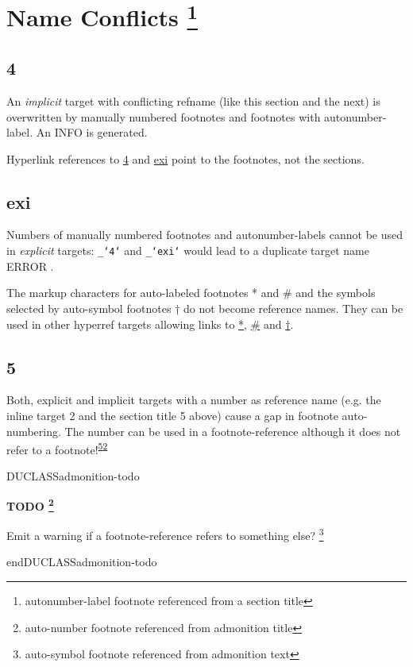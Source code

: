 \documentclass[a4paper]{article}
\newenvironment{DUclass}[1]%
    {%
     \def\DocutilsClassFunctionName{DUCLASS#1}
     \csname \DocutilsClassFunctionName \endcsname}%
    {\csname end\DocutilsClassFunctionName \endcsname}%
\newenvironment{DUadmonition}%
    {\begin{center}
       \begin{lrbox}{\DUadmonitionbox}
         \begin{minipage}{0.9\linewidth}
    }%
    {    \end{minipage}
       \end{lrbox}
       \fbox{\usebox{\DUadmonitionbox}}
     \end{center}
    }
\providecommand*{\DUtitle}[1]{%
  \smallskip\noindent\textbf{#1}\smallskip}
\begin{document}
\section{Name Conflicts%
\texorpdfstring{%
 \protect\footnote{\label{sec}%
  autonumber-label footnote referenced from a section title
}}{}}


\subsection{4}

An \emph{implicit} target with conflicting refname (like this section and the
next) is overwritten by manually numbered footnotes and footnotes
with autonumber-label.  An INFO is generated.

Hyperlink references to \hyperref[footnote-1]{4} and \hyperref[exi]{exi} point to the footnotes, not the
sections.


\subsection{exi}

Numbers of manually numbered footnotes and autonumber-labels
cannot be used in \emph{explicit} targets:
\texttt{\_`4`} and \texttt{\_`exi`} would lead to a \textquotedbl{}duplicate target name\textquotedbl{} ERROR .

The markup characters for auto-labeled footnotes \textquotedbl{}%
\label{inline-1}*\textquotedbl{} and \textquotedbl{}%
\label{inline-2}\#\textquotedbl{} and
the symbols selected by auto-symbol footnotes \textquotedbl{}%
\label{inline-3}†\textquotedbl{} do not become
reference names. They can be used in other hyperref targets allowing
links to \hyperref[inline-1]{*}, \hyperref[inline-2]{\#} and \hyperref[inline-3]{†}.


\subsection{5%
  \label{section-2}%
}

Both, explicit and implicit targets with a number as reference name (e.g.
the inline target \textquotedbl{}%
\label{inline-4}2\textquotedbl{} and the section title \textquotedbl{}5\textquotedbl{} above) cause a gap in
footnote auto-numbering.  The number can be used in a
footnote-reference although it does not refer to a footnote!\textsuperscript{\hyperref[section-2]{5}}\textsuperscript{\hyperref[inline-4]{2}}

\begin{DUclass}{admonition-todo}
\begin{DUadmonition}
\DUtitle{TODO%
 \protect\footnote{%
  auto-number footnote referenced from admonition title
}}

Emit a warning if a footnote-reference refers to something else?%
\footnote{%
  auto-symbol footnote referenced from admonition text
}
\end{DUadmonition}
\end{DUclass}
\end{document}
